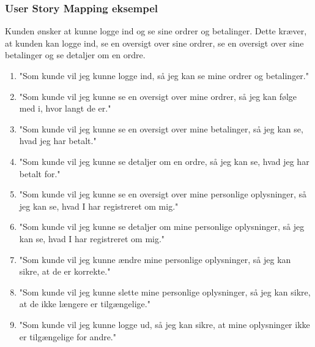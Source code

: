 \subsubsection{User Story Mapping eksempel}
Kunden ønsker at kunne logge ind og se sine ordrer og betalinger. Dette kræver, at kunden kan logge ind, se en oversigt over sine ordrer, se en oversigt over sine betalinger og se detaljer om en ordre.
\begin{enumerate}
    \item "Som kunde vil jeg kunne logge ind, så jeg kan se mine ordrer og betalinger."
    \item "Som kunde vil jeg kunne se en oversigt over mine ordrer, så jeg kan følge med i, hvor langt de er."
    \item "Som kunde vil jeg kunne se en oversigt over mine betalinger, så jeg kan se, hvad jeg har betalt."
    \item "Som kunde vil jeg kunne se detaljer om en ordre, så jeg kan se, hvad jeg har betalt for."
    \item "Som kunde vil jeg kunne se en oversigt over mine personlige oplysninger, så jeg kan se, hvad I har registreret om mig."
    \item "Som kunde vil jeg kunne se detaljer om mine personlige oplysninger, så jeg kan se, hvad I har registreret om mig."
    \item "Som kunde vil jeg kunne ændre mine personlige oplysninger, så jeg kan sikre, at de er korrekte."
    \item "Som kunde vil jeg kunne slette mine personlige oplysninger, så jeg kan sikre, at de ikke længere er tilgængelige."
    \item "Som kunde vil jeg kunne logge ud, så jeg kan sikre, at mine oplysninger ikke er tilgængelige for andre."
    \label{item:user-story-mapping-eksempel}
\end{enumerate}

